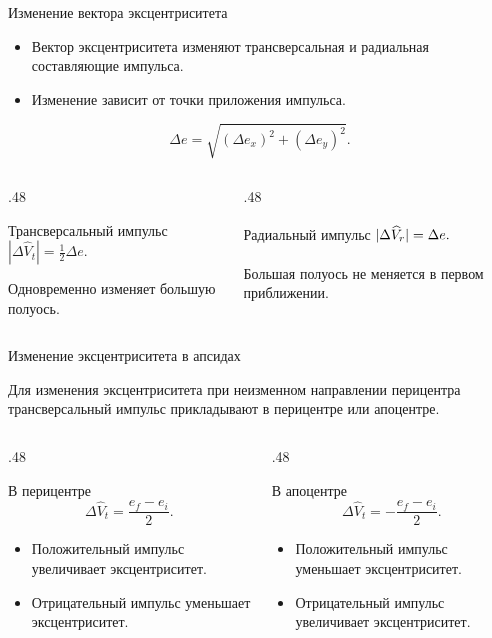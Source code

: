 \documentclass[11pt,aspectratio=169,t]{beamer}
\begin{document}
\begin{frame}{Изменение вектора эксцентриситета}
\relax
\begin{itemize}
 \setlength{\itemsep}{5pt}
 \item Вектор эксцентриситета изменяют трансверсальная и радиальная составляющие импульса.
 \item Изменение зависит от точки приложения импульса.
\end{itemize}
\[
 \Delta e=\sqrt{(\Delta e_x)^2+(\Delta e_y)^2}.
\]
\begin{columns}[T,onlytextwidth]
\begin{column}{.48\textwidth}
\begin{block}{Трансверсальный импульс}
\centering $\displaystyle |\Delta\widehat V_t|=\frac12\Delta e.$\par\smallskip
\RaggedRight
Одновременно изменяет большую полуось.
\end{block}
\end{column}
\begin{column}{.48\textwidth}
\begin{block}{Радиальный импульс}
\centering $\displaystyle \vphantom{\frac12}|\Delta\widehat V_r|=\Delta e.$\par\smallskip
\RaggedRight
Большая полуось не меняется в первом приближении.
\end{block}
\end{column}
\end{columns}
\end{frame}

\begin{frame}{Изменение эксцентриситета в апсидах}
\relax
{\justifying
Для изменения эксцентриситета при неизменном направлении перицентра трансверсальный импульс прикладывают в перицентре или апоцентре.\par}
\smallskip
\begin{columns}[T,onlytextwidth]
\begin{column}{.48\textwidth}
\begin{block}{В перицентре}
\[
 \Delta\widehat V_t=\frac{e_f-e_i}{2}.
\]
\begin{itemize}
 \setlength{\itemsep}{3pt}
 \item Положительный импульс увеличивает эксцентриситет.
 \item Отрицательный импульс уменьшает эксцентриситет.
\end{itemize}
\end{block}
\end{column}
\begin{column}{.48\textwidth}
\begin{block}{В апоцентре}
\[
 \Delta\widehat V_t=-\frac{e_f-e_i}{2}.
\]
\begin{itemize}
 \setlength{\itemsep}{3pt}
 \item Положительный импульс уменьшает эксцентриситет.
 \item Отрицательный импульс увеличивает эксцентриситет.
\end{itemize}
\end{block}
\end{column}
\end{columns}
\end{frame}
\end{document}
